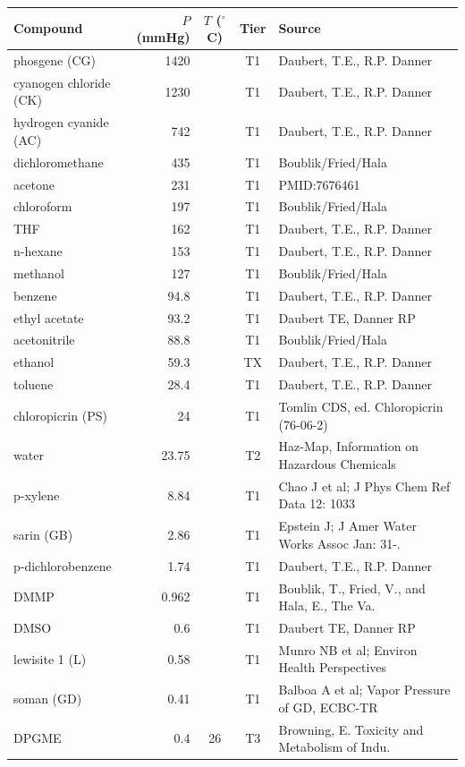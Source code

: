\begin{tabular}{lrccl}
\hline
Compound & $P$ (mmHg) & $T$ ($^{\circ}$C) & Tier & Source \\
\hline
phosgene (CG) & 1420 &  & T1 & Daubert, T.E., R.P. Danner \\
cyanogen chloride (CK) & 1230 &  & T1 & Daubert, T.E., R.P. Danner \\
hydrogen cyanide (AC) & 742 &  & T1 & Daubert, T.E., R.P. Danner \\
dichloromethane & 435 &  & T1 & Boublik/Fried/Hala \\
acetone & 231 &  & T1 & PMID:7676461 \\
chloroform & 197 &  & T1 & Boublik/Fried/Hala \\
THF & 162 &  & T1 & Daubert, T.E., R.P. Danner \\
n-hexane & 153 &  & T1 & Daubert, T.E., R.P. Danner \\
methanol & 127 &  & T1 & Boublik/Fried/Hala \\
benzene & 94.8 &  & T1 & Daubert, T.E., R.P. Danner \\
ethyl acetate & 93.2 &  & T1 & Daubert TE, Danner RP \\
acetonitrile & 88.8 &  & T1 & Boublik/Fried/Hala \\
ethanol & 59.3 &  & TX & Daubert, T.E., R.P. Danner \\
toluene & 28.4 &  & T1 & Daubert, T.E., R.P. Danner \\
chloropicrin (PS) & 24 &  & T1 & Tomlin CDS, ed. Chloropicrin (76-06-2) \\
water & 23.75 &  & T2 & Haz-Map, Information on Hazardous Chemicals \\
p-xylene & 8.84 &  & T1 & Chao J et al; J Phys Chem Ref Data 12: 1033 \\
sarin (GB) & 2.86 &  & T1 & Epstein J; J Amer Water Works Assoc Jan: 31-. \\
p-dichlorobenzene & 1.74 &  & T1 & Daubert, T.E., R.P. Danner \\
DMMP & 0.962 &  & T1 & Boublik, T., Fried, V., and Hala, E., The Va. \\
DMSO & 0.6 &  & T1 & Daubert TE, Danner RP \\
lewisite 1 (L) & 0.58 &  & T1 & Munro NB et al; Environ Health Perspectives \\
soman (GD) & 0.41 &  & T1 & Balboa A et al; Vapor Pressure of GD, ECBC-TR \\
DPGME & 0.4 & 26 & T3 & Browning, E. Toxicity and Metabolism of Indu. \\

\end{tabular}
